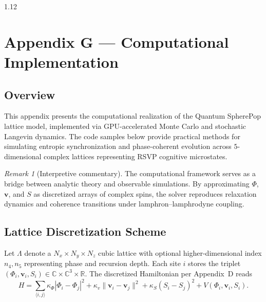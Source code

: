 \documentclass[12pt,a4paper]{article}
\numberwithin{equation}{section}
\theoremstyle{remark}
\newtheorem{remark}{Remark}[section]
\theoremstyle{definition}
\begin{document}
\begin{spacing}{1.12}
\linespread{1.05}
\setlength{\parindent}{0pt}


\section*{Appendix G — Computational Implementation}

\subsection{Overview}\label{sec:G-overview}
This appendix presents the computational realization of the Quantum SpherePop lattice model, implemented via GPU-accelerated Monte Carlo and stochastic Langevin dynamics.  
The code samples below provide practical methods for simulating entropic synchronization and phase-coherent evolution across $5$-dimensional complex lattices representing RSVP cognitive microstates.

\begin{remark}[Interpretive commentary]
The computational framework serves as a bridge between analytic theory and observable simulations. By approximating $\Phi$, $\mathbf{v}$, and $S$ as discretized arrays of complex spins, the solver reproduces relaxation dynamics and coherence transitions under lamphron--lamphrodyne coupling.
\end{remark}

\subsection{Lattice Discretization Scheme}\label{sec:G-lattice}

Let $\Lambda$ denote a $N_x\times N_y\times N_z$ cubic lattice with optional higher-dimensional index $n_4,n_5$ representing phase and recursion depth.  
Each site $i$ stores the triplet $(\Phi_i,\mathbf{v}_i,S_i)\in\mathbb{C}\times\mathbb{C}^3\times\mathbb{R}$.  
The discretized Hamiltonian per Appendix~D reads
\[
H = \sum_{\langle i,j\rangle} \kappa_\Phi|\Phi_i-\Phi_j|^2 + \kappa_v\|\mathbf{v}_i-\mathbf{v}_j\|^2 + \kappa_S(S_i-S_j)^2 + V(\Phi_i,\mathbf{v}_i,S_i).
\]


\end{spacing}
\end{document}
